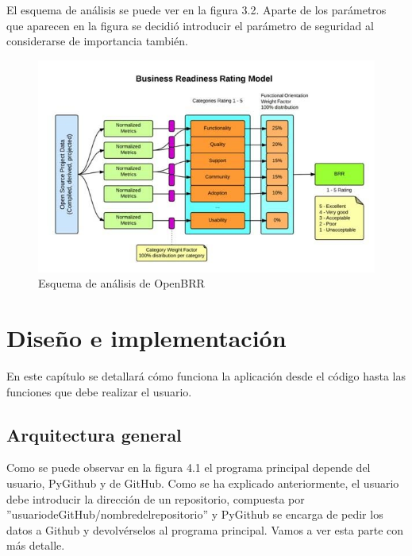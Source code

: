 \documentclass[a4paper, 12pt]{book}
\begin{document}
El esquema de análisis se puede ver en la figura 3.2. Aparte de los parámetros que aparecen en la figura se decidió introducir el parámetro de seguridad al considerarse de importancia también.

\begin{figure}
  \centering
  \includegraphics[width=14cm, keepaspectratio]{img/openbrr.png}
  \caption{Esquema de análisis de OpenBRR}\label{fig:OpenBRR}
\end{figure}



\cleardoublepage
\chapter{Diseño e implementación}

En este capítulo se detallará cómo funciona la aplicación desde el código hasta las funciones que debe realizar el usuario.

\section{Arquitectura general} 
\label{sec:arquitectura}

Como se puede observar en la figura 4.1 el programa principal depende del usuario, PyGithub y de GitHub. Como se ha explicado anteriormente, el usuario debe introducir la dirección de un repositorio, compuesta por ''usuario\textunderscore de\textunderscore GitHub/nombre\textunderscore del\textunderscore repositorio'' y PyGithub se encarga de pedir los datos a Github y devolvérselos al programa principal. Vamos a ver esta parte con más detalle.
\end{document}
